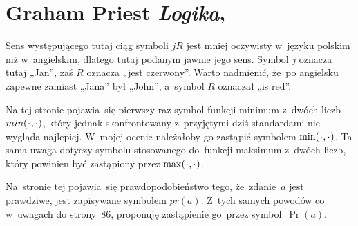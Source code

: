 \documentclass[a4paper,11pt]{article}
\numberwithin{equation}{section}
\begin{document}
\VerSpaceSix












\section{Graham Priest \textit{Logika},
  \parencite{Priest-Logika-Pub-2023}}




\vspace{0em}


\noindent
{} Sens występującego tutaj ciąg symboli $jR$ jest
mniej oczywisty w~języku polskim niż w~angielskim, dlatego tutaj podanym
jawnie jego sens. Symbol $j$ oznacza tutaj „Jan”, zaś $R$ oznacza „jest
czerwony”. Warto nadmienić, że~po angielsku zapewne zamiast „Jana” był
„John”, a~symbol $R$ oznaczał „is red”.

\VerSpaceFour





\noindent
{} Na tej stronie pojawia~się pierwszy raz symbol funkcji minimum
z~dwóch liczb
$min( \hspace{0.05em} \cdot \hspace{0.05em} , \cdot \hspace{0.05em} )$, który jednak
skonfrontowany z~przyjętymi dziś standardami nie wygląda najlepiej.
W~mojej ocenie należałoby go zastąpić symbolem
$\min( \hspace{0.05em} \cdot \hspace{0.05em} , \cdot \hspace{0.05em} )$. Ta sama uwaga dotyczy
symbolu stosowanego do~funkcji maksimum z~dwóch liczb, który powinien być
zastąpiony przez $\max( \hspace{0.05em} \cdot \hspace{0.05em} , \cdot \hspace{0.05em} )$.

\VerSpaceFour





\noindent
{} Na~stronie tej pojawia~się prawdopodobieństwo tego, że~zdanie~$a$
jest prawdziwe, jest zapisywane symbolem $pr( a )$. Z~tych samych powodów
co w~uwagach do strony~86, proponuję zastąpienie go~przez
symbol~$\Pr( a )$.

\VerSpaceFour





\end{document}
